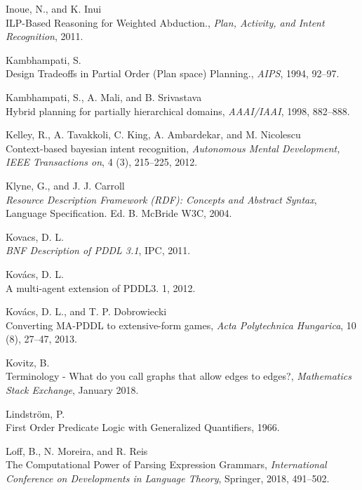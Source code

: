 \documentclass[11pt,a4paper,twoside,openright,titlepage,numbers=noenddot,headinclude,cleardoublepage=empty,openany]{scrreprt}
\theoremstyle{plain}
\theoremstyle{definition}
\theoremstyle{remark}
\begin{document}
\leavevmode\hypertarget{ref-inoue_ilpbased_2011}{}%
Inoue, N., and K. Inui\\
ILP-Based Reasoning for Weighted Abduction., \emph{Plan, Activity, and
Intent Recognition}, 2011.

\leavevmode\hypertarget{ref-kambhampati_design_1994}{}%
Kambhampati, S.\\
Design Tradeoffs in Partial Order (Plan space) Planning., \emph{AIPS},
1994, 92--97.

\leavevmode\hypertarget{ref-kambhampati_hybrid_1998}{}%
Kambhampati, S., A. Mali, and B. Srivastava\\
Hybrid planning for partially hierarchical domains, \emph{AAAI/IAAI},
1998, 882--888.

\leavevmode\hypertarget{ref-kelley_contextbased_2012}{}%
Kelley, R., A. Tavakkoli, C. King, A. Ambardekar, and M. Nicolescu\\
Context-based bayesian intent recognition, \emph{Autonomous Mental
Development, IEEE Transactions on}, 4 (3), 215--225, 2012.

\leavevmode\hypertarget{ref-klyne_resource_2004}{}%
Klyne, G., and J. J. Carroll\\
\emph{Resource Description Framework (RDF): Concepts and Abstract
Syntax}, Language Specification. Ed. B. McBride W3C, 2004.

\leavevmode\hypertarget{ref-kovacs_bnf_2011}{}%
Kovacs, D. L.\\
\emph{BNF Description of PDDL 3.1}, IPC, 2011.

\leavevmode\hypertarget{ref-kovacs_multiagent_2012}{}%
Kovács, D. L.\\
A multi-agent extension of PDDL3. 1, 2012.

\leavevmode\hypertarget{ref-kovacs_converting_2013}{}%
Kovács, D. L., and T. P. Dobrowiecki\\
Converting MA-PDDL to extensive-form games, \emph{Acta Polytechnica
Hungarica}, 10 (8), 27--47, 2013.

\leavevmode\hypertarget{ref-kovitz_terminology_2018}{}%
Kovitz, B.\\
Terminology - What do you call graphs that allow edges to edges?,
\emph{Mathematics Stack Exchange}, January 2018.

\leavevmode\hypertarget{ref-lindstrom_first_1966}{}%
Lindström, P.\\
First Order Predicate Logic with Generalized Quantifiers, 1966.

\leavevmode\hypertarget{ref-loff_computational_2018}{}%
Loff, B., N. Moreira, and R. Reis\\
The Computational Power of Parsing Expression Grammars,
\emph{International Conference on Developments in Language Theory},
Springer, 2018, 491--502.
\end{document}
